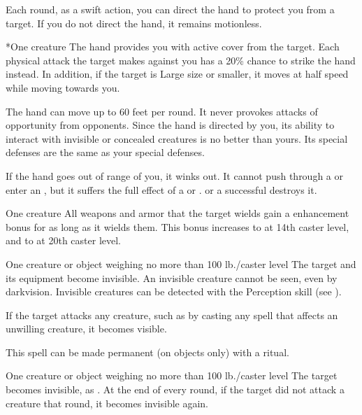 Each round, as a swift action, you can direct the hand to protect you from a target. If you do not direct the hand, it remains motionless.
\begin{spelltarget}*{One creature}
    \spelleffect The hand provides you with active cover from the target. Each physical attack the target makes against you has a 20\% chance to strike the hand instead. In addition, if the target is Large size or smaller, it moves at half speed while moving towards you.
\end{spelltarget}
\spellnotes The hand can move up to 60 feet per round. It never provokes attacks of opportunity from opponents. Since the hand is directed by you, its ability to interact with invisible or concealed creatures is no better than yours. Its special defenses are the same as your special defenses.

If the hand goes out of range of you, it winks out. It cannot push through a  or enter an , but it suffers the full effect of a  or .  or a successful  destroys it.

\spellrng{\rngclose}
\spelldur{\durshort}
\begin{spelltarget}{One creature}
    \spelleffect All weapons and armor that the target wields gain a  enhancement bonus for as long as it wields them. This bonus increases to  at 14th caster level, and to  at 20th caster level.
\end{spelltarget}

\spellrng{\rngclose}
\spelldur{\durshort \dismissable}
\begin{spelltarget}{One creature or object weighing no more than 100 lb./caster level}
    \spelleffect The target and its equipment become invisible. An invisible creature cannot be seen, even by darkvision. Invisible creatures can be detected with the Perception skill (see ).

    If the target attacks any creature, such as by casting any spell that affects an unwilling creature, it becomes visible.
\end{spelltarget}
\spellnotes This spell can be made permanent (on objects only) with a  ritual.

\spellrng{\rngclose}
\spelldur{\durshort \dismissable}
\begin{spelltarget}{One creature or object weighing no more than 100 lb./caster level}
    \spelleffect The target becomes invisible, as . At the end of every round, if the target did not attack a creature that round, it becomes invisible again.
\end{spelltarget}

